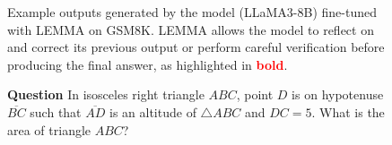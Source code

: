 \begin{figure}
\begin{tcolorbox}[boxrule=0.5mm, left=1mm, right=1mm, top=1mm, bottom=1mm,title=\textbf{Example 4}]
    \end{tcolorbox}


    \caption{Example outputs generated by the model (LLaMA3-8B) fine-tuned with LEMMA on GSM8K. LEMMA allows the model to reflect on and correct its previous output or perform careful verification before producing the final answer, as highlighted in \textcolor{red}{\textbf{bold}}.}
    \label{fig:case_study_gsm8k}
\end{figure}




\begin{figure}
    \centering
    \small

        
        
        
        
        
        


    \begin{tcolorbox}[boxrule=0.5mm, left=1mm, right=1mm, top=1mm, bottom=1mm,title=\textbf{Example 1}]
        \textbf{Question}
        In isosceles right triangle $ABC$, point $D$ is on hypotenuse $\overline{BC}$ such that $\overline{AD}$ is an altitude of $\triangle ABC$ and $DC = 5$. What is the area of triangle $ABC$?


\end{tcolorbox}
\end{figure}
